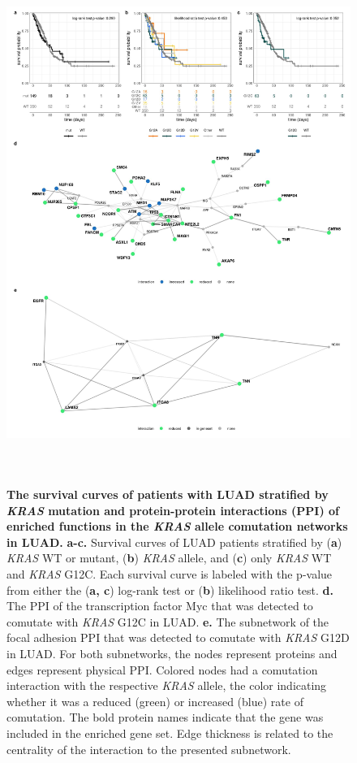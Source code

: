\documentclass[english, 10pt, letterpaper]{article}
\newcommand{\KRAS}{\emph{KRAS}}
\begin{document}
\begin{figure}[p]
\centering
\includegraphics[height=170mm]{figures/SuppFigure_11.jpeg}
\caption{
    \textbf{The survival curves of patients with LUAD stratified by \KRAS{} mutation and protein-protein interactions (PPI) of enriched functions in the \KRAS{} allele comutation networks in LUAD.}
    \textbf{a-c.} Survival curves of LUAD patients stratified by (\textbf{a}) \KRAS{} WT or mutant, (\textbf{b}) \KRAS{} allele, and (\textbf{c}) only \KRAS{} WT and \KRAS{} G12C. Each survival curve is labeled with the p-value from either the (\textbf{a, c}) log-rank test or (\textbf{b}) likelihood ratio test.
    \textbf{d.} The PPI of the transcription factor Myc that was detected to comutate with \KRAS{} G12C in LUAD.
    \textbf{e.} The subnetwork of the focal adhesion PPI that was detected to comutate with \KRAS{} G12D in LUAD.
    For both subnetworks, the nodes represent proteins and edges represent physical PPI. Colored nodes had a comutation interaction with the respective \KRAS{} allele, the color indicating whether it was a reduced (green) or increased (blue) rate of comutation.
    The bold protein names indicate that the gene was included in the enriched gene set.
    Edge thickness is related to the centrality of the interaction to the presented subnetwork.
}
\label{sfig:luad-comutation-supplementary}
\end{figure}
\end{document}
